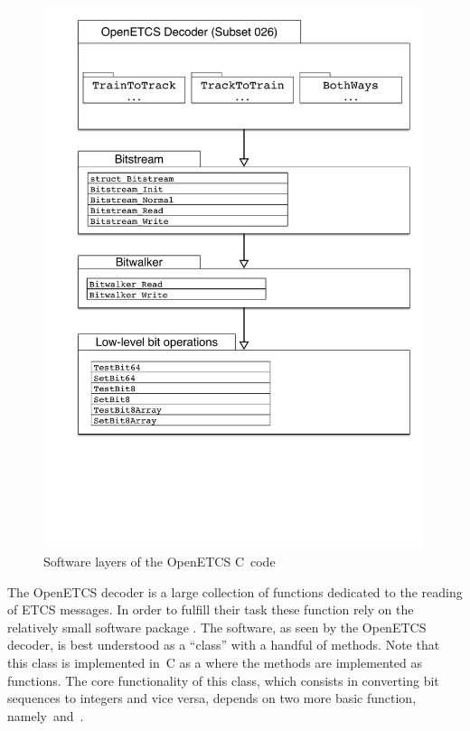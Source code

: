 \begin{figure}[hbt]
\begin{center}
\includegraphics[width=0.99\textwidth]{figures/software-layers.pdf}
\caption{\label{fig:software-layers} Software layers of the OpenETCS C~code}
\end{center}
\end{figure}

\FloatBarrier

The OpenETCS decoder is a large collection of functions dedicated to
the reading of ETCS messages.
In order to fulfill their task these function rely on the relatively
small software package .
The  software, as seen by the OpenETCS decoder,
is best understood as a ``class'' with a handful of methods.
Note that this class is implemented in~C as a  where
the methods are implemented as functions.
The core functionality  of this class, which consists in converting bit sequences to integers
and vice versa, depends on two more basic function, namely~\peek and~\poke.

